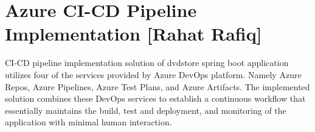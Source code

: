 \section{Azure CI-CD Pipeline Implementation [Rahat Rafiq]}\label{sec:azure-ci-cd-pipeline- implementation-sec}

CI-CD pipeline implementation solution of dvdstore spring boot application utilizes four of the services provided by Azure DevOps platform. Namely Azure Repos, Azure Pipelines, Azure Test Plans, and Azure Artifacts. The implemented solution combines these DevOps services to establish a continuous workflow that essentially maintains the build, test and deployment, and monitoring of the application with minimal human interaction.